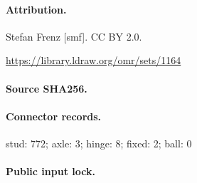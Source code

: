 \paragraph{Attribution.}Stefan Frenz [smf]. CC BY 2.0.\par\url{https://library.ldraw.org/omr/sets/1164}
\paragraph{Source SHA256.}
\paragraph{Connector records.}stud: 772; axle: 3; hinge: 8; fixed: 2; ball: 0
\paragraph{Public input lock.}
